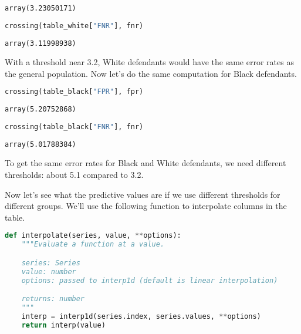 \begin{lstlisting}[style=output]
array(3.23050171)
\end{lstlisting}

\begin{lstlisting}[language=Python,style=source]
crossing(table_white["FNR"], fnr)
\end{lstlisting}

\begin{lstlisting}[style=output]
array(3.11998938)
\end{lstlisting}

With a threshold near 3.2, White defendants would have the same error
rates as the general population. Now let's do the same computation for
Black defendants.

\begin{lstlisting}[language=Python,style=source]
crossing(table_black["FPR"], fpr)
\end{lstlisting}

\begin{lstlisting}[style=output]
array(5.20752868)
\end{lstlisting}

\begin{lstlisting}[language=Python,style=source]
crossing(table_black["FNR"], fnr)
\end{lstlisting}

\begin{lstlisting}[style=output]
array(5.01788384)
\end{lstlisting}

To get the same error rates for Black and White defendants, we need
different thresholds: about 5.1 compared to 3.2.

\pagebreak

Now let's see what the predictive values are if we use different
thresholds for different groups. We'll use the following function to
interpolate columns in the table.

\begin{lstlisting}[language=Python,style=source]
def interpolate(series, value, **options):
    """Evaluate a function at a value.

    series: Series
    value: number
    options: passed to interp1d (default is linear interpolation)

    returns: number
    """
    interp = interp1d(series.index, series.values, **options)
    return interp(value)
\end{lstlisting}

